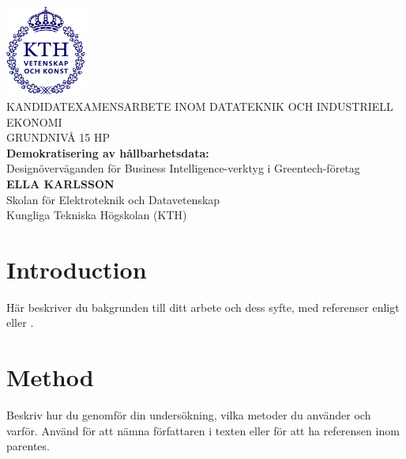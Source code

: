\documentclass[a4paper,12pt,twocolumn]{article}
\begin{document}
\begin{titlepage}
    \centering
    \includegraphics[width=0.2\textwidth]{kthLogga.png}\\[1cm]
    {\large KANDIDATEXAMENSARBETE INOM DATATEKNIK OCH INDUSTRIELL EKONOMI}\\[0.5cm]
    {\large GRUNDNIVÅ 15 HP}\\[3cm]
    {\Huge \textbf{Demokratisering av hållbarhetsdata:}}\\[0.5cm]
    {\Large Designöverväganden för Business Intelligence-verktyg i Greentech-företag}\\[1cm]
    \vfill
    {\Large \textbf{ELLA KARLSSON}}\\[1cm]
    \vfill
    {\large Skolan för Elektroteknik och Datavetenskap}\\
    {\large Kungliga Tekniska Högskolan (KTH)}\\
\end{titlepage}
\clearpage


\begin{abstract}
Två trender som blivit alltmer påtagliga de senaste åren är ökade datamängder och ökat fokus på klimatförändringar. Denna rapport undersöker hur hållbarhetsdata kan integreras i Business Intelligence (BI) för greentech-företag.
\end{abstract}

\tableofcontents
\newpage

\section{Introduction}
Här beskriver du bakgrunden till ditt arbete och dess syfte, med referenser enligt \citet{author2025} eller \citep{author2025}.

\section{Method}
Beskriv hur du genomför din undersökning, vilka metoder du använder och varför. Använd \citet{example2025} för att nämna författaren i texten eller \citep{example2025} för att ha referensen inom parentes.
\end{document}

